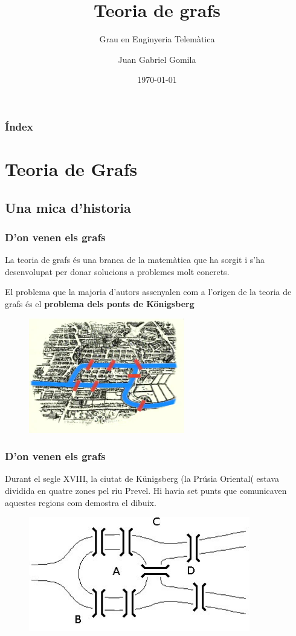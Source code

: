\documentclass{beamer}
\title[Tema 8 - Introducció a la Teoria de Grafs]{Teoria de grafs}
\subtitle{Grau en Enginyeria Telemàtica}
\author[Juan Gabriel Gomila]{
Juan Gabriel Gomila%
}
\institute[UIB]{
 Grau en Enginyeria Telemàtica
 \and
  Universitat de les Illes Balears
  \and
  \texttt{juangabriel.gomila@uib.es}
}
\date{\today}
\begin{document}
 

\frame{\titlepage}

\begin{frame}
  \frametitle{Índex}
  \tableofcontents
\end{frame}

\section{Teoria de Grafs}
\subsection{Una mica d'historia}


\begin{frame}
\frametitle{D'on venen els grafs}
La teoria de grafs és una branca de la matemàtica que ha sorgit i s'ha desenvolupat per donar solucions a problemes molt concrets. 

El problema que la majoria d'autors assenyalen com a l'origen de la teoria de grafs és el \textbf{problema dels ponts de Königsberg}


\begin{figure}[h]
 \label{fig:volum}
\centering
\includegraphics[height=5cm]{konisgberg}
\end{figure}
 
\end{frame}

\begin{frame}
\frametitle{D'on venen els grafs}
Durant el segle XVIII, la ciutat de Künigsberg (la Prúsia Oriental( estava dividida en quatre zones pel riu Prevel. Hi havia set punts que comunicaven aquestes regions com demostra el dibuix.

\begin{figure}[h]
 \label{fig:volum}
\centering
\includegraphics[height=5cm]{kon2}
\end{figure}
\end{frame}
\end{document}

